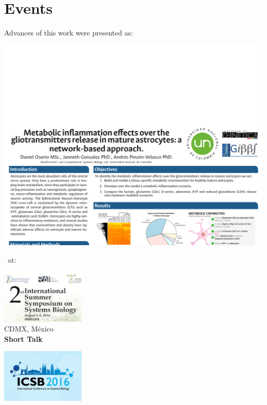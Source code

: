 \documentclass[11pt]{beamer}
\begin{document}
\section{Events}
\begin{frame}{Advances of this work were presented as:}
\begin{center}
\includegraphics[width=\textwidth]{Events}
\end{center}
\hrulefill \ at: \hrulefill
\begin{multicols}{3}
\begin{center}
\includegraphics[width=0.3\textwidth]{IS3B}\\
CDMX, México\\
\textbf{Short Talk}
\end{center}
\begin{center}
\includegraphics[width=0.3\textwidth]{ICSB}\\

\end{center}
\end{multicols}
\end{frame}
\end{document}
